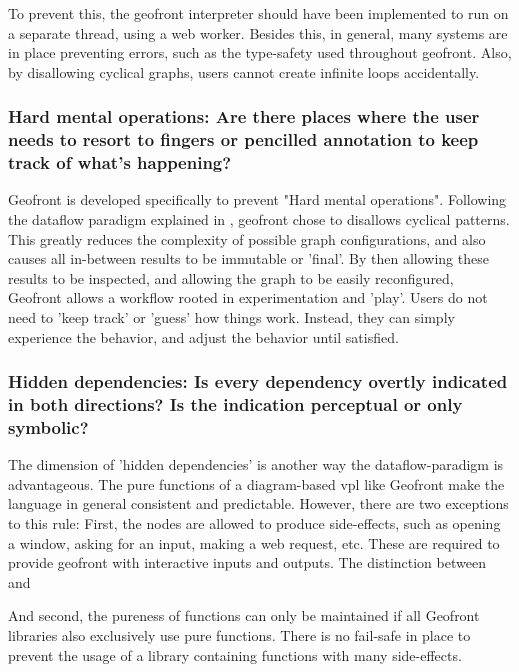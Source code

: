 To prevent this, the geofront interpreter should have been implemented to run on a separate thread, using a web worker. 
Besides this, in general, many systems are in place preventing errors, such as the type-safety used throughout geofront.
Also, by disallowing cyclical graphs, users cannot create infinite loops accidentally.

\subsubsection*{Hard mental operations: Are there places where the user needs to resort to fingers or pencilled annotation to keep track of what's happening?}

Geofront is developed specifically to prevent "Hard mental operations".
Following the dataflow paradigm explained in , geofront chose to disallows cyclical patterns. 
This greatly reduces the complexity of possible graph configurations, and also causes all in-between results to be immutable or 'final'.
By then allowing these results to be inspected, and allowing the graph to be easily reconfigured, Geofront allows a workflow rooted in experimentation and 'play'.
Users do not need to 'keep track' or 'guess' how things work.
Instead, they can simply experience the behavior, and adjust the behavior until satisfied. 



\subsubsection*{Hidden dependencies: Is every dependency overtly indicated in both directions? Is the indication perceptual or only symbolic?}

The dimension of 'hidden dependencies' is another way the dataflow-paradigm is advantageous. 
The pure functions of a diagram-based vpl like Geofront make the language in general consistent and predictable.
However, there are two exceptions to this rule:
First, the  nodes are allowed to produce side-effects, such as opening a window, asking for an input, making a web request, etc. 
These are required to provide geofront with interactive inputs and outputs.
The distinction between  and \m{}

And second, the pureness of functions can only be maintained if all Geofront libraries also exclusively use pure functions. 
There is no fail-safe in place to prevent the usage of a library containing functions with many side-effects. 

